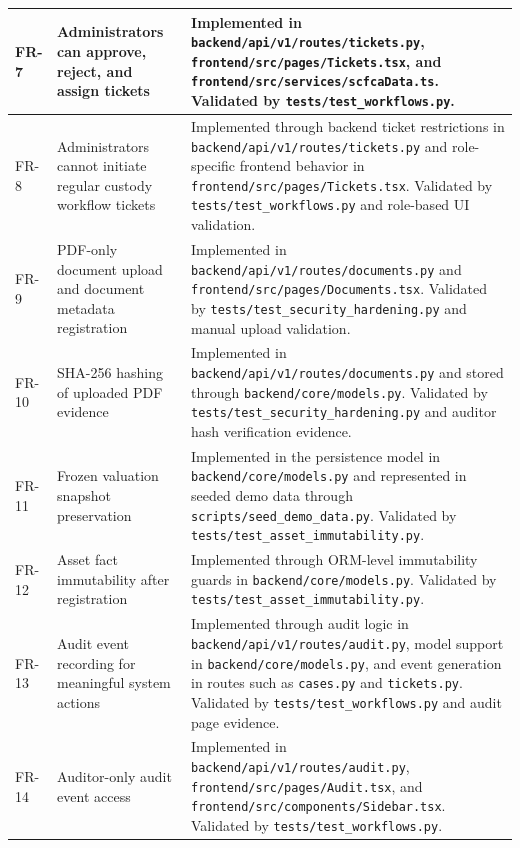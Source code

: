 \documentclass[12pt,a4paper]{report}
\begin{document}
\begin{longtable}{|p{1.1cm}|p{5.0cm}|p{9.0cm}|}
FR-7 & Administrators can approve, reject, and assign tickets &
Implemented in \texttt{backend/api/v1/routes/tickets.py}, \texttt{frontend/src/pages/Tickets.tsx}, and \texttt{frontend/src/services/scfcaData.ts}. Validated by \texttt{tests/test\_workflows.py}. \\
\hline

FR-8 & Administrators cannot initiate regular custody workflow tickets &
Implemented through backend ticket restrictions in \texttt{backend/api/v1/routes/tickets.py} and role-specific frontend behavior in \texttt{frontend/src/pages/Tickets.tsx}. Validated by \texttt{tests/test\_workflows.py} and role-based UI validation. \\
\hline

FR-9 & PDF-only document upload and document metadata registration &
Implemented in \texttt{backend/api/v1/routes/documents.py} and \texttt{frontend/src/pages/Documents.tsx}. Validated by \texttt{tests/test\_security\_hardening.py} and manual upload validation. \\
\hline

FR-10 & SHA-256 hashing of uploaded PDF evidence &
Implemented in \texttt{backend/api/v1/routes/documents.py} and stored through \texttt{backend/core/models.py}. Validated by \texttt{tests/test\_security\_hardening.py} and auditor hash verification evidence. \\
\hline

FR-11 & Frozen valuation snapshot preservation &
Implemented in the persistence model in \texttt{backend/core/models.py} and represented in seeded demo data through \texttt{scripts/seed\_demo\_data.py}. Validated by \texttt{tests/test\_asset\_immutability.py}. \\
\hline

FR-12 & Asset fact immutability after registration &
Implemented through ORM-level immutability guards in \texttt{backend/core/models.py}. Validated by \texttt{tests/test\_asset\_immutability.py}. \\
\hline

FR-13 & Audit event recording for meaningful system actions &
Implemented through audit logic in \texttt{backend/api/v1/routes/audit.py}, model support in \texttt{backend/core/models.py}, and event generation in routes such as \texttt{cases.py} and \texttt{tickets.py}. Validated by \texttt{tests/test\_workflows.py} and audit page evidence. \\
\hline

FR-14 & Auditor-only audit event access &
Implemented in \texttt{backend/api/v1/routes/audit.py}, \texttt{frontend/src/pages/Audit.tsx}, and \texttt{frontend/src/components/Sidebar.tsx}. Validated by \texttt{tests/test\_workflows.py}. \\
\hline


\end{longtable}
\end{document}
